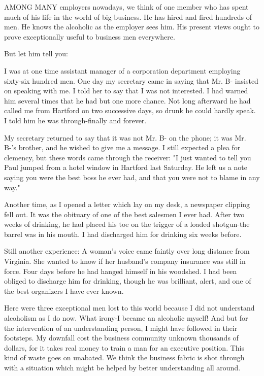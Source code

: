 
\bbChapterPreamble


\begin{biblechapter}
    AMONG MANY employers nowadays, we think of one member who has spent much of his life in the world of big business.  He has hired and fired hundreds of men.  He knows the alcoholic as the employer sees him.  His present views ought to prove exceptionally useful to business men everywhere. 

But let him tell you:

I was at one time assistant manager of a corporation department employing sixty-six hundred men.  One day my secretary came in saying that Mr. B- insisted on speaking with me.  I told her to say that I was not interested.  I had warned him several times that he had but one more chance.  Not long afterward he had called me from Hartford on two successive days, so drunk he could hardly speak.  I told him he was through-finally and forever.

My secretary returned to say that it was not Mr. B- on the phone; it was Mr. B-'s brother, and he wished to give me a message.  I still expected a plea for clemency, but these words came through the receiver:  "I just wanted to tell you Paul jumped from a hotel window in Hartford last Saturday.  He left us a note saying you were the best boss he ever had, and that you were not to blame in any way."

Another time, as I opened a letter which lay on my desk, a newspaper clipping fell out.  It was the obituary of one of the best salesmen I ever had.  After two weeks of drinking, he had placed his toe on the trigger of a loaded shotgun-the barrel was in his mouth.  I had discharged him for drinking six weeks before.

Still another experience:  A woman's voice came faintly over long distance from Virginia.  She wanted to know if her husband's company insurance was still in force.  Four days before he had hanged himself in his woodshed.  I had been obliged to discharge him for drinking, though he was brilliant, alert, and one of the best organizers I have ever known.

Here were three exceptional men lost to this world because I did not understand alcoholism as I do now.  What irony-I became an alcoholic myself!  And but for the intervention of an understanding person, I might have followed in their footsteps.  My downfall cost the business community unknown thousands of dollars, for it takes real money to train a man for an executive position.  This kind of waste goes on unabated.  We think the business fabric is shot through with a situation which might be helped by better understanding all around. 


\end{biblechapter}
